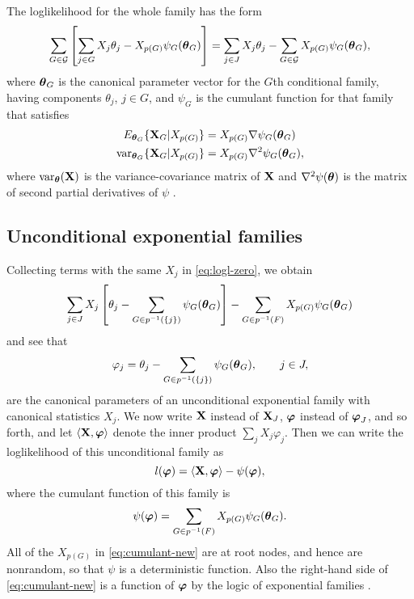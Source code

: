The loglikelihood for the whole family has the form
\begin{equation} \label{eq:logl-zero}
   \sum_{G \in \mathcal{G}}
   \left[ \sum_{j \in G} X_j \theta_j - X_{p(G)} \psi_G({\boldsymbol{\theta}}_G) \right]
   =
   \sum_{j \in J} X_j \theta_j
   -
   \sum_{G \in \mathcal{G}} X_{p(G)} \psi_G({\boldsymbol{\theta}}_G),
\end{equation}
where
${\boldsymbol{\theta}}_G$ is the canonical parameter vector for the $G$th
conditional family, having components $\theta_j$, $j \in G$,
and $\psi_G$ is the cumulant function for that family
\citep[pp.~105, 139, 150]{barndorff} that satisfies
\begin{align}
   E_{{\boldsymbol{\theta}}_G} \{ \mathbf{X}_G | X_{p(G)} \}
   & =
   X_{p(G)} \nabla \psi_G({\boldsymbol{\theta}}_G)
   \label{eq:bartlett-1}
   \\
   \operatorname{var}_{{\boldsymbol{\theta}}_G} \{ \mathbf{X}_G | X_{p(G)} \}
   & =
   X_{p(G)} \nabla^2 \psi_G({\boldsymbol{\theta}}_G)
   \label{eq:bartlett-2},
\end{align}
where $\operatorname{var}_{\boldsymbol{\theta}}(\mathbf{X})$ is
the variance-covariance matrix of $\mathbf{X}$
and $\nabla^2 \psi({\boldsymbol{\theta}})$ is
the matrix of second partial derivatives of $\psi$
\citep[p.~150]{barndorff}.

\subsection{Unconditional exponential families} \label{sec:FEF}

Collecting terms with the same $X_j$ in \eqref{eq:logl-zero}, we obtain
\begin{equation*} %
   \sum_{j \in J} X_j \left[
   \theta_j
   -
   \sum_{G \in p^{-1}(\{j\})} \psi_G(\boldtheta_G)
   \right]
   -
   \sum_{G \in p^{-1}(F)} X_{p(G)} \psi_G(\boldtheta_G)
\end{equation*}
and see that
\begin{equation} \label{eq:new}
   \varphi_j = \theta_j - \sum_{G \in p^{-1}(\{j\})} \psi_G({\boldsymbol{\theta}}_G),
   \qquad j \in J,
\end{equation}
are the canonical parameters of an unconditional exponential family with canonical
statistics $X_j$.  We now write $\mathbf{X}$ instead of $\mathbf{X}_J$, ${\boldsymbol{\varphi}}$ instead
of ${\boldsymbol{\varphi}}_J$, and so forth,
and let $\langle  \mathbf{X}, {\boldsymbol{\varphi}}  \rangle$ denote the inner product $\sum_j X_j \varphi_j$.
Then we can write the loglikelihood of this unconditional family as
\begin{equation} \label{eq:logl-new}
   l({\boldsymbol{\varphi}}) = \langle  \mathbf{X}, {\boldsymbol{\varphi}}  \rangle - \psi({\boldsymbol{\varphi}}),
\end{equation}
where the cumulant function of this family is
\begin{equation} \label{eq:cumulant-new}
   \psi({\boldsymbol{\varphi}}) = \sum_{G \in p^{-1}(F)} X_{p(G)} \psi_G({\boldsymbol{\theta}}_G).
\end{equation}
All of the $X_{p(G)}$ in \eqref{eq:cumulant-new}
are at root nodes, and hence are nonrandom,
so that $\psi$ is a deterministic function.  Also
the right-hand side
of \eqref{eq:cumulant-new} is a function
of ${\boldsymbol{\varphi}}$ by the logic of exponential families
\citep[pp.~105 ff.]{barndorff}.

